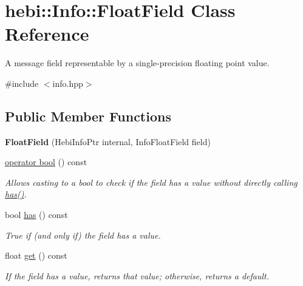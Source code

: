 \hypertarget{classhebi_1_1Info_1_1FloatField}{}\section{hebi\+:\+:Info\+:\+:Float\+Field Class Reference}
\label{classhebi_1_1Info_1_1FloatField}


A message field representable by a single-\/precision floating point value.  




{\ttfamily \#include $<$info.\+hpp$>$}

\subsection*{Public Member Functions}
\begin{DoxyCompactItemize}
\item 
\mbox{\label{classhebi_1_1Info_1_1FloatField_ae39eb285e1a2a021b429735d0f30cb4f}} 
{\bfseries Float\+Field} (Hebi\+Info\+Ptr internal, Info\+Float\+Field field)
\item 
\hyperlink{classhebi_1_1Info_1_1FloatField_addb566585d4c83cc9cf16dc511cc1321}{operator bool} () const
\begin{DoxyCompactList}\small\item\em Allows casting to a bool to check if the field has a value without directly calling {\ttfamily \hyperlink{classhebi_1_1Info_1_1FloatField_a02808f458244bf363e6cdea1f30aaf9d}{has()}}. \end{DoxyCompactList}\item 
\mbox{\label{classhebi_1_1Info_1_1FloatField_a02808f458244bf363e6cdea1f30aaf9d}} 
bool \hyperlink{classhebi_1_1Info_1_1FloatField_a02808f458244bf363e6cdea1f30aaf9d}{has} () const
\begin{DoxyCompactList}\small\item\em True if (and only if) the field has a value. \end{DoxyCompactList}\item 
\mbox{\label{classhebi_1_1Info_1_1FloatField_a9924f4ae13b87962d885ec09157ed965}} 
float \hyperlink{classhebi_1_1Info_1_1FloatField_a9924f4ae13b87962d885ec09157ed965}{get} () const
\begin{DoxyCompactList}\small\item\em If the field has a value, returns that value; otherwise, returns a default. \end{DoxyCompactList}\end{DoxyCompactItemize}


